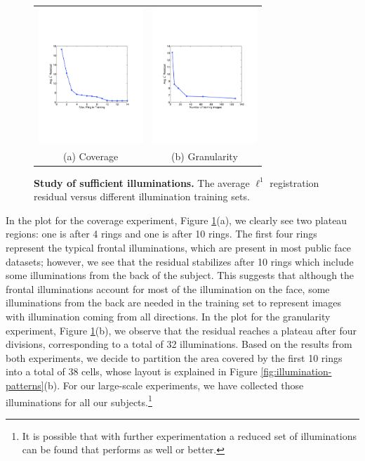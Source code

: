 \begin{figure}
\centering
\begin{tabular}{@{}c@{}c@{}}
\includegraphics[height=2in]{figures_pami/illum_results/coverage_sunset.pdf} &
\includegraphics[height=2in]{figures_pami/illum_results/granularity_sunset.pdf} \\
(a) Coverage & (b) Granularity
\end{tabular}
\caption{\small{\bf Study of sufficient illuminations.} The average $\ell^1$ registration residual versus different illumination training sets. }
\label{fig:illumination-sufficiency}
\end{figure}

In the plot for the coverage experiment, Figure
\ref{fig:illumination-sufficiency}(a),
 we clearly see two plateau regions: one is after 4 rings
and one is after 10 rings. The first four rings represent the
typical frontal illuminations, which are present in most public
face datasets; however, we see that the residual stabilizes
after 10 rings which include some illuminations from the back
of the subject. This suggests that although the frontal
illuminations account for most of the illumination on the face,
some illuminations from the back are needed in the training set to
represent images with illumination coming from all directions.
In the plot for the granularity experiment, Figure
\ref{fig:illumination-sufficiency}(b), we observe that the
residual reaches a plateau after four divisions, corresponding
to a total of 32 illuminations. Based on the results from both
experiments, we decide to partition the area covered by the
first 10 rings into a total of 38 cells, whose layout is
explained in Figure \ref{fig:illumination-patterns}(b). For
our large-scale experiments, we have collected those
illuminations for all our subjects.\footnote{It is possible
that with further experimentation a reduced set of illuminations
can be found that performs as well or better.}

